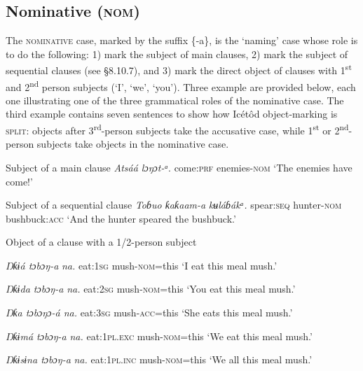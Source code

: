 \subsection{Nominative (\textsc{nom})}


The \textsc{nominative} case, marked by the suffix \{-a\}, is the ‘naming’ case whose role is to do the following: 1) mark the subject of main clauses, 2) mark the subject of sequential clauses (see §8.10.7), and 3) mark the direct object of clauses with 1\textsuperscript{st} and 2\textsuperscript{nd} person subjects (‘I’, ‘we’, ‘you’). Three example are provided below, each one illustrating one of the three grammatical roles of the nominative case. The third example contains seven sentences to show how Icétôd object-marking is \textsc{split}: objects after 3\textsuperscript{rd}{}-person subjects take the accusative case, while 1\textsuperscript{st} or 2\textsuperscript{nd}{}-person subjects take objects in the nominative case.




Subject of a main clause
\textit{Atsáá   lɔŋɔt-}\textit{ᵃ}.
come:\textsc{prf}   enemies-\textsc{nom}
‘The enemies have come!’




Subject of a sequential clause
\textit{Toɓuo   ƙaƙaam-}\textit{a}\textit{   kʉláɓákᵃ.}
spear:\textsc{seq}   hunter-\textsc{nom}   bushbuck:\textsc{acc}
‘And the hunter speared the bushbuck.’




Object of a clause with a 1/2-person subject




\textit{Ŋƙɨá   tɔbɔŋ-}\textit{a}\textit{ na.}
eat:\textsc{1sg}   mush-\textsc{nom}=this
‘I eat this meal mush.’




\textit{Ŋƙɨda   tɔbɔŋ-}\textit{a}\textit{ na.}
eat:\textsc{2sg}   mush-\textsc{nom}=this
‘You eat this meal mush.’




\textit{Ŋƙa   tɔbɔŋɔ-á na.}
eat:\textsc{3sg}   mush-\textsc{acc}=this
‘She eats this meal mush.’




\textit{Ŋƙɨmá     tɔbɔŋ-}\textit{a}\textit{ na.}
eat:\textsc{1pl.exc}   mush-\textsc{nom}=this
‘We eat this meal mush.’




\textit{Ŋƙɨsɨna     tɔbɔŋ-}\textit{a}\textit{ na.}
eat:\textsc{1pl.inc}   mush-\textsc{nom}=this
‘We all this meal mush.’




